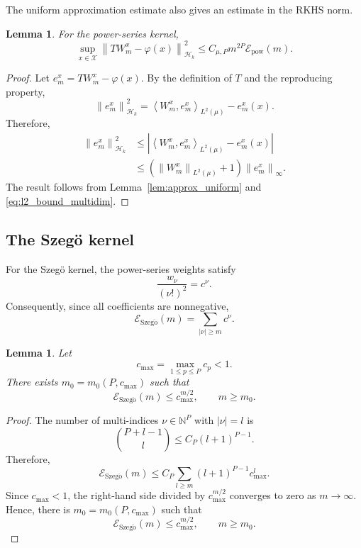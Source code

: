 \documentclass[11pt]{article}
\numberwithin{equation}{section}
\theoremstyle{plain}
\newtheorem{lemma}[theorem]{Lemma}
\theoremstyle{definition}
\theoremstyle{remark}
\newcommand{\X}{\mathcal{X}}
\newcommand{\Hs}{\mathcal{H}}
\newcommand{\norm}[1]{\left\lVert#1\right\rVert}
\newcommand{\innerpro}[1]{\left\langle#1\right\rangle}
\begin{document}
The uniform approximation estimate also gives an estimate in the RKHS norm.

\begin{lemma}
\label{lem:approx_RKHS}
For the power-series kernel,
\begin{equation}
\sup_{x\in\X}
\norm{TW_m^x-\varphi(x)}_{\Hs_k}^2
\leq
C_{\mu,P}m^{2P}\mathcal{E}_{\mathrm{pow}}(m).
\label{eq:approx_RKHS}
\end{equation}
\end{lemma}

\begin{proof}
Let $e_m^x=TW_m^x-\varphi(x)$. By the definition of $T$ and the
reproducing property,
\[
\norm{e_m^x}_{\Hs_k}^2
=
\innerpro{W_m^x,e_m^x}_{L^2(\mu)}
-
e_m^x(x).
\]
Therefore,
\[
\begin{aligned}
\norm{e_m^x}_{\Hs_k}^2
&\leq
\left|
\innerpro{W_m^x,e_m^x}_{L^2(\mu)}
-
e_m^x(x)
\right|\\
&\leq
\left(
\norm{W_m^x}_{L^2(\mu)}+1
\right)
\norm{e_m^x}_{\infty}.
\end{aligned}
\]
The result follows from Lemma~\ref{lem:approx_uniform} and
\eqref{eq:l2_bound_multidim}.
\end{proof}

\subsection{The Szegö kernel}

For the Szegö kernel, the power-series weights satisfy
\[
\frac{w_\nu}{(\nu!)^2}=c^\nu.
\]
Consequently, since all coefficients are nonnegative,
\begin{equation}
\mathcal{E}_{\mathrm{Szeg\ddot{o}}}(m)
=
\sum_{|\nu|\geq m}c^\nu.
\label{eq:approx_szeg}
\end{equation}

\begin{lemma}
\label{lem:approx_szeg}
Let
\[
c_{\max}=\max_{1\leq p\leq P}c_p<1.
\]
There exists $m_0=m_0(P,c_{\max})$ such that
\begin{equation}
\mathcal{E}_{\mathrm{Szeg\ddot{o}}}(m)
\leq
c_{\max}^{m/2},
\qquad
m\geq m_0.
\label{eq:main_bound_approx}
\end{equation}
\end{lemma}

\begin{proof}
The number of multi-indices $\nu\in\mathbb{N}^P$ with $|\nu|=l$ is
\[
\binom{P+l-1}{l}\leq C_P(l+1)^{P-1}.
\]
Therefore,
\[
\mathcal{E}_{\mathrm{Szeg\ddot{o}}}(m)
\leq
C_P\sum_{l\geq m}(l+1)^{P-1}c_{\max}^l.
\]
Since $c_{\max}<1$, the right-hand side divided by
$c_{\max}^{m/2}$ converges to zero as $m\to\infty$.
Hence, there is $m_0=m_0(P,c_{\max})$ such that
\[
\mathcal{E}_{\mathrm{Szeg\ddot{o}}}(m)
\leq
c_{\max}^{m/2},
\qquad m\geq m_0.
\]
\end{proof}
\end{document}
